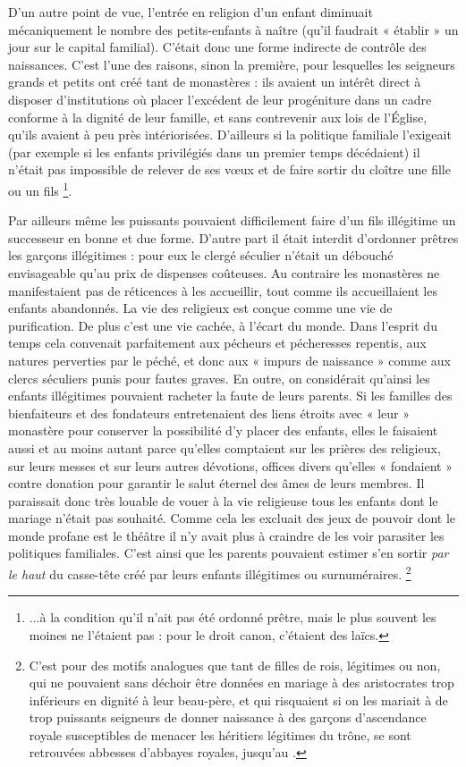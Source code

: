  D'un autre point de vue, l'entrée en religion d'un enfant diminuait mécaniquement le nombre des petits-enfants à naître (qu'il faudrait « établir » un jour sur le capital familial). C'était donc une forme indirecte de contrôle des naissances. C'est l'une des raisons, sinon la première, pour lesquelles les seigneurs grands et petits ont créé tant de monastères : ils avaient un intérêt direct à disposer d'institutions où placer l'excédent de leur progéniture dans un cadre conforme à la dignité de leur famille, et sans contrevenir aux lois de l'Église, qu'ils avaient à peu près intériorisées. D'ailleurs si la politique familiale l'exigeait (par exemple si les enfants privilégiés dans un premier temps décédaient) il n'était pas impossible de relever de ses vœux et de faire sortir du cloître une fille ou un fils \footnote{...à la condition qu'il n'ait pas été ordonné prêtre, mais le plus souvent les moines ne l'étaient pas : pour le droit canon, c'étaient des laïcs.}.

 Par ailleurs même les puissants pouvaient difficilement faire d'un fils illégitime un successeur en bonne et due forme. D'autre part il était interdit d'ordonner prêtres les garçons illégitimes : pour eux le clergé séculier n'était un débouché envisageable qu'au prix de dispenses coûteuses. Au contraire les monastères ne manifestaient pas de réticences à les accueillir, tout comme ils accueillaient les enfants abandonnés. La vie des religieux est conçue comme une vie de purification. De plus c'est une vie cachée, à l'écart du monde. Dans l'esprit du temps cela convenait parfaitement aux pécheurs et pécheresses repentis, aux natures perverties par le péché, et donc aux « impurs de naissance » comme aux clercs séculiers punis pour fautes graves. En outre, on considérait qu'ainsi les enfants illégitimes pouvaient racheter la faute de leurs parents. Si les familles des bienfaiteurs et des fondateurs entretenaient des liens étroits avec « leur » monastère pour conserver la possibilité d'y placer des enfants, elles le faisaient aussi et au moins autant parce qu'elles comptaient sur les prières des religieux, sur leurs messes et sur leurs autres dévotions, offices divers qu'elles « fondaient » contre donation pour garantir le salut éternel des âmes de leurs membres. Il paraissait donc très louable de vouer à la vie religieuse tous les enfants dont le mariage n'était pas souhaité. Comme cela les excluait des jeux de pouvoir dont le monde profane est le théâtre il n'y avait plus à craindre de les voir parasiter les politiques familiales. C'est ainsi que les parents pouvaient estimer s'en sortir \emph{par le haut} du casse-tête créé par leurs enfants illégitimes ou surnuméraires. \footnote{C'est pour des motifs analogues que tant de filles de rois, légitimes ou non, qui ne pouvaient sans déchoir être données en mariage à des aristocrates trop inférieurs en dignité à leur beau-père, et qui risquaient si on les mariait à de trop puissants seigneurs de donner naissance à des garçons d'ascendance royale susceptibles de menacer les héritiers légitimes du trône, se sont retrouvées abbesses d'abbayes royales, jusqu'au .} 

